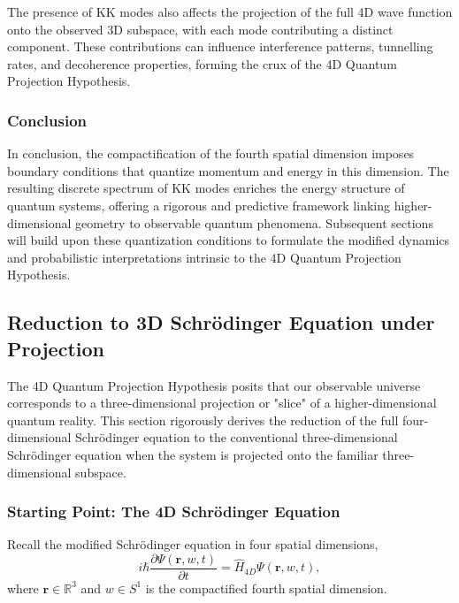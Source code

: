 \documentclass[12pt]{article}
\begin{document}
The presence of KK modes also affects the projection of the full 4D wave function onto the observed 3D subspace, with each mode contributing a distinct component. These contributions can influence interference patterns, tunnelling rates, and decoherence properties, forming the crux of the 4D Quantum Projection Hypothesis.

\subsubsection*{Conclusion}


In conclusion, the compactification of the fourth spatial dimension imposes boundary conditions that quantize momentum and energy in this dimension. The resulting discrete spectrum of KK modes enriches the energy structure of quantum systems, offering a rigorous and predictive framework linking higher-dimensional geometry to observable quantum phenomena. Subsequent sections will build upon these quantization conditions to formulate the modified dynamics and probabilistic interpretations intrinsic to the 4D Quantum Projection Hypothesis.

\subsection{Reduction to 3D Schrödinger Equation under Projection}

The 4D Quantum Projection Hypothesis posits that our observable universe corresponds to a three-dimensional projection or "slice" of a higher-dimensional quantum reality. This section rigorously derives the reduction of the full four-dimensional Schrödinger equation to the conventional three-dimensional Schrödinger equation when the system is projected onto the familiar three-dimensional subspace.

\subsubsection*{Starting Point: The 4D Schrödinger Equation}

Recall the modified Schrödinger equation in four spatial dimensions,
\begin{equation}
    i \hbar \frac{\partial \Psi(\mathbf{r}, w, t)}{\partial t} = \hat{H}_{4D} \Psi(\mathbf{r}, w, t),
    \label{eq:4D_Schrodinger}
\end{equation}
where \(\mathbf{r} \in \mathbb{R}^3\) and \(w \in S^1\) is the compactified fourth spatial dimension.
\end{document}
